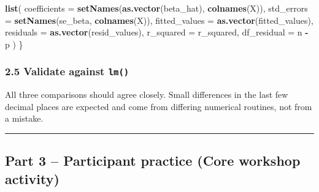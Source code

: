 \documentclass[11pt]{article}
\newenvironment{Shaded}{\begin{snugshade}}{\end{snugshade}}
\newcommand{\AttributeTok}[1]{\textcolor[rgb]{0.13,0.29,0.53}{#1}}
\newcommand{\FunctionTok}[1]{\textcolor[rgb]{0.13,0.29,0.53}{\textbf{#1}}}
\newcommand{\NormalTok}[1]{#1}
\newcommand{\OtherTok}[1]{\textcolor[rgb]{0.56,0.35,0.01}{#1}}
\newcommand{\SpecialCharTok}[1]{\textcolor[rgb]{0.81,0.36,0.00}{\textbf{#1}}}
\newcommand{\StringTok}[1]{\textcolor[rgb]{0.31,0.60,0.02}{#1}}
\begin{document}
\begin{Shaded}
\begin{Highlighting}[]
  \FunctionTok{list}\NormalTok{(}
    \AttributeTok{coefficients =} \FunctionTok{setNames}\NormalTok{(}\FunctionTok{as.vector}\NormalTok{(beta\_hat), }\FunctionTok{colnames}\NormalTok{(X)),}
    \AttributeTok{std\_errors =} \FunctionTok{setNames}\NormalTok{(se\_beta, }\FunctionTok{colnames}\NormalTok{(X)),}
    \AttributeTok{fitted\_values =} \FunctionTok{as.vector}\NormalTok{(fitted\_values),}
    \AttributeTok{residuals =} \FunctionTok{as.vector}\NormalTok{(resid\_values),}
    \AttributeTok{r\_squared =}\NormalTok{ r\_squared,}
    \AttributeTok{df\_residual =}\NormalTok{ n }\SpecialCharTok{{-}}\NormalTok{ p}
\NormalTok{  )}
\NormalTok{\}}
\end{Highlighting}
\end{Shaded}

\hypertarget{validate-against-lm}{%
\subsubsection{\texorpdfstring{2.5 Validate against
\texttt{lm()}}{2.5 Validate against lm()}}\label{validate-against-lm}}

\begin{Shaded}
\end{Shaded}

All three comparisons should agree closely. Small differences in the
last few decimal places are expected and come from differing numerical
routines, not from a mistake.

\begin{center}\rule{0.5\linewidth}{0.5pt}\end{center}

\hypertarget{part-3-participant-practice-core-workshop-activity}{%
\subsection{Part 3 -- Participant practice (Core workshop
activity)}\label{part-3-participant-practice-core-workshop-activity}}
\end{document}
